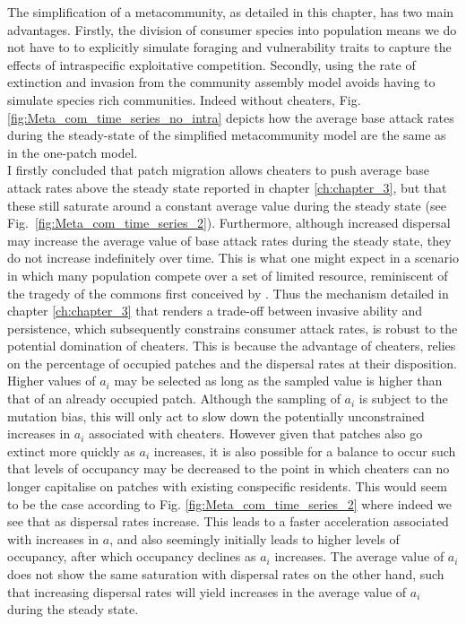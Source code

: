 \documentclass[a4paper]{report}
\begin{document}
The simplification  of a metacommunity, as detailed in this chapter, has two main advantages. Firstly, the division of consumer species into population means we do not have to to explicitly simulate foraging and vulnerability traits to capture the effects of intraspecific exploitative competition. Secondly, using the rate of extinction and invasion from the community assembly model avoids having to simulate species rich communities. Indeed without cheaters, Fig. \ref{fig:Meta_com_time_series_no_intra} depicts how the average base attack rates during the steady-state of the simplified metacommunity model are the same as in the one-patch model. \\

  I firstly concluded that patch migration allows cheaters to push average base attack rates above the steady state reported in chapter \ref{ch:chapter_3}, but that these still saturate around a constant average value during the steady state (see Fig.~\ref{fig:Meta_com_time_series_2}). Furthermore, although increased dispersal may increase the average value of base attack rates during the steady state, they do not increase indefinitely over time. This is what one might expect in a scenario in which many population compete over a set of limited resource, reminiscent of the tragedy of the commons first conceived by \citep{Hardin1968}. Thus the mechanism detailed in chapter \ref{ch:chapter_3} that renders a trade-off between invasive ability and persistence, which subsequently constrains consumer attack rates, is robust to the potential domination of cheaters. This is because the advantage of cheaters, relies on the percentage of occupied patches and the dispersal rates at their disposition. Higher values of $a_i$ may be selected as long as the sampled value is higher than that of an already occupied patch. Although the sampling of $a_i$ is subject to the mutation bias, this will only act to slow down the potentially unconstrained increases in $a_i$ associated with cheaters. However given that patches also go extinct more quickly as $a_i$ increases, it is also possible for a balance to occur such that levels of occupancy may be decreased to the point in which cheaters can no longer capitalise on patches with existing conspecific residents. This would seem to be the case according to Fig. \ref{fig:Meta_com_time_series_2} where indeed we see that as dispersal rates increase. This leads to a faster acceleration associated with increases in $a$, and also seemingly initially leads to higher levels of occupancy, after which occupancy declines as $a_i$ increases. The average value of $a_i$ does not show the same saturation with dispersal rates on the other hand, such that increasing dispersal rates will yield increases in the average value of $a_i$ during the steady state.  \\
  
\end{document}
